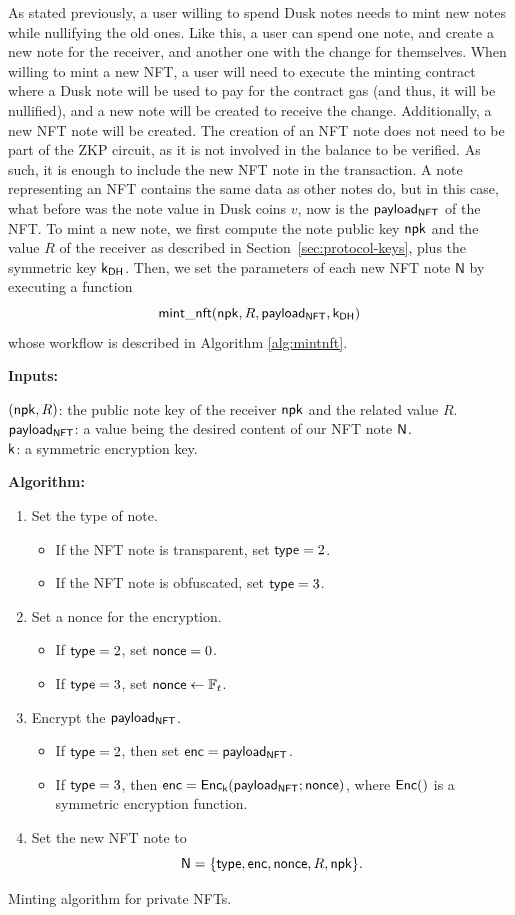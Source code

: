 As stated previously, a user willing to spend Dusk notes needs to mint new notes while nullifying the old ones. Like this, a user can spend one note, and create a new note for the receiver, and another one with the change for themselves. When willing to mint a new NFT, a user will need to execute the minting contract where a Dusk note will be used to pay for the contract gas (and thus, it will be nullified), and a new note will be created to receive the change. Additionally, a new NFT note will be created. The creation of an NFT note does not need to be part of the ZKP circuit, as it is not involved in the balance to be verified. As such, it is enough to include the new NFT note in the transaction. A note representing an NFT contains the same data as other notes do, but in this case, what before was the note value in Dusk coins $v$, now is the $\mathsf{payload_{NFT}}$ of the NFT. To mint a new note, we first compute the note public key $\mathsf{npk}$ and the value $R$ of the receiver as described in Section~\ref{sec:protocol-keys}, plus the symmetric key $\mathsf{k_{DH}}$. Then, we set the parameters of each new NFT note $\mathsf{N}$ by executing a function 
\[\mathsf{mint\_nft}(\mathsf{npk}, R, \mathsf{payload_{NFT}}, \mathsf{k_{DH}})\]
whose workflow is described in Algorithm \ref{alg:mintnft}.

\begin{algorithm}
\SetAlgoLined
\textbf{Inputs:} \par
$(\mathsf{npk}, R)$: the public note key of the receiver $\mathsf{npk}$ and the related value $R$.\\
$\mathsf{payload_{NFT}}$: a value being the desired content of our NFT note $\mathsf{N}{}$.\\
$\mathsf{k}$: a symmetric encryption key.\break

\textbf{Algorithm:}
	\begin{enumerate}
		\item Set the type of note.
		\begin{itemize}
			\item If the NFT note is transparent, set $\mathsf{type} = 2$.
			\item If the NFT note is obfuscated, set $\mathsf{type} = 3$.
		\end{itemize}
		\item Set a nonce for the encryption.
		\begin{itemize}
			\item If $\mathsf{type} = 2$, set $\mathsf{nonce} = 0$.
			\item If $\mathsf{type} = 3$, set $\mathsf{nonce} \leftarrow \mathbb{F}_t$.
		\end{itemize}
		\item Encrypt the $\mathsf{payload_{NFT}}$.
		\begin{itemize}
			\item If $\mathsf{type} = 2$, then set $\mathsf{enc} = \mathsf{payload_{NFT}}$.
			\item If $\mathsf{type} = 3$, then 
			$\mathsf{enc} = \mathsf{Enc}_{\mathsf{k}} (\mathsf{payload_{NFT}}; \mathsf{nonce})$,
			where $\mathsf{Enc}()$ is a symmetric encryption function. 
		\end{itemize}
		\item Set the new NFT note to \[\mathsf{N} = \{\mathsf{type}, \mathsf{enc}, \mathsf{nonce}, R, \mathsf{npk}\}.\]
	\end{enumerate}
	\caption{Minting algorithm for private NFTs.}
	\label{alg:mintnft}
\end{algorithm}

